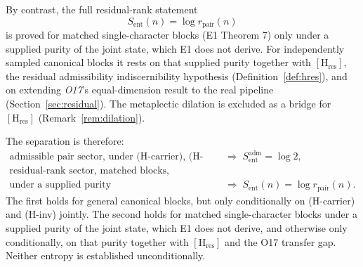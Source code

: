 \documentclass[11pt]{article}
\newcommand{\Sent}{S_{\mathrm{ent}}}
\newcommand{\Sadm}{S_{\mathrm{ent}}^{\mathrm{adm}}}
\newcommand{\rpair}{r_{\mathrm{pair}}}
\newcommand{\Hres}{[\mathrm{H}_{\mathrm{res}}]}
\begin{document}
    By contrast, the full residual-rank statement
    \[
      \Sent(n) = \log \rpair(n)
    \]
    is proved for matched single-character blocks (E1 Theorem 7) only under a supplied purity of
    the joint state, which E1 does not derive.
    For independently sampled canonical blocks it rests on that supplied purity together with
    $\Hres$, the residual admissibility indiscernibility hypothesis (Definition~\ref{def:hres}),
    and on extending \emph{O17}'s equal-dimension result to the real pipeline
    (Section~\ref{sec:residual}).
    The metaplectic dilation is excluded as a bridge for $\Hres$ (Remark~\ref{rem:dilation}).

    The separation is therefore:
    \begin{align*}
      \text{admissible pair sector, under (H-carrier), (H-inv)}
      &\;\Longrightarrow\;
      \Sadm = \log 2,\\
      \text{residual-rank sector, matched blocks,}\\
      \text{under a supplied purity}
      &\;\Longrightarrow\;
      \Sent(n) = \log \rpair(n).
    \end{align*}
    The first holds for general canonical blocks, but only conditionally on (H-carrier) and
    (H-inv) jointly.
    The second holds for matched single-character blocks under a supplied purity of the joint
    state, which E1 does not derive, and otherwise only conditionally, on that purity together
    with $\Hres$ and the O17 transfer gap.
    Neither entropy is established unconditionally.

    \newpage
    
    
\end{document}
